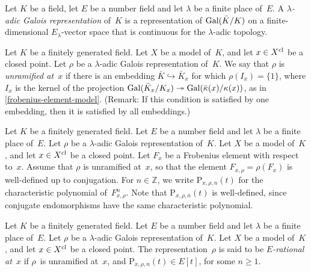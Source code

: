 \documentclass[10pt,twoside,leqno]{article}
\numberwithin{equation}{subsection}
\newcommand{\into}{\hookrightarrow}
\newcommand{\onto}{\twoheadrightarrow}
\newcommand{\ZZ}{\mathbb{Z}}
\newcommand{\Gal}{\textnormal{Gal}}
\newcommand{\cl}{\textnormal{cl}}
\begin{document}
\begin{definition} %
 \label{lambda-adic-galois-representation}
 Let $K$ be a field, let $E$ be a number field
 and let $\lambda$ be a finite place of~$E$.
 A \emph{$\lambda$-adic Galois representation} of~$K$
 is a representation of $\Gal(\bar{K}/K)$
 on a finite-dimensional $E_\lambda$-vector space
 that is continuous for the $\lambda$-adic topology.
\end{definition}

\begin{definition} %
 \label{unramified-representation}
	Let $K$ be a finitely generated field.
 Let $X$ be a model of~$K$, and let $x \in X^\cl$ be a closed point.
 Let $\rho$ be a $\lambda$-adic Galois representation of~$K$.
 We say that $\rho$ is \emph{unramified at~$x$}
 if there is an embedding $\bar{K} \into \bar{K}_x$
 for which $\rho(I_x) = \{1\}$,
 where $I_x$ is the kernel of the projection
 $\Gal(\bar{K}_x/K_x) \onto \Gal(\bar{\kappa}(x)/\kappa(x))$,
 as in \cref{frobenius-element-model}.
 (Remark:
 If this condition is satisfied by one embedding,
 then it is satisfied by all embeddings.)
\end{definition}

\begin{notation} %
 \label{frobenius-characteristic-polynomial}
 \gdef\Frobcharpol{\mathrm{P}}
 Let $K$ be a finitely generated field.
 Let $E$ be a number field
 and let $\lambda$ be a finite place of~$E$.
 Let $\rho$ be a $\lambda$-adic Galois representation of~$K$.
 Let $X$ be a model of~$K$,
 and let $x \in X^\cl$ be a closed point.
 Let $F_x$ be a Frobenius element with respect to~$x$.
 Assume that $\rho$ is unramified at~$x$,
 so that the element $F_{x,\rho} = \rho(F_x)$ is well-defined up to conjugation.
 For $n \in \ZZ$, we write $\Frobcharpol_{x,\rho,n}(t)$
 for the characteristic polynomial of~$F_{x,\rho}^n$.
 Note that $\Frobcharpol_{x,\rho,n}(t)$ is well-defined,
 since conjugate endomorphisms have the same characteristic polynomial.
\end{notation}

\begin{definition} %
 \label{rational-galois-representation}
	Let $K$ be a finitely generated field.
 Let $E$ be a number field
 and let $\lambda$ be a finite place of~$E$.
 Let $\rho$ be a $\lambda$-adic Galois representation of~$K$.
 Let $X$ be a model of~$K$,
 and let $x \in X^\cl$ be a closed point.
 The representation~$\rho$ is said to be \emph{$E$-rational at~$x$} if
 $\rho$~is unramified at~$x$,
 and $\Frobcharpol_{x,\rho,n}(t) \in E[t]$,
 for some $n \ge 1$.
\end{definition}
\end{document}
